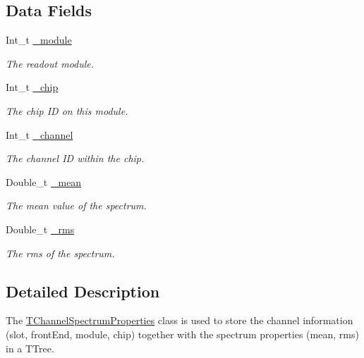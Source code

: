 \subsection*{Data Fields}
\begin{DoxyCompactItemize}
\item 
Int\_\-t \hyperlink{class_t_channel_spectrum_properties_ae3cf44950a58087f83b1660648750619}{\_\-module}
\begin{DoxyCompactList}\small\item\em The readout module. \item\end{DoxyCompactList}\item 
Int\_\-t \hyperlink{class_t_channel_spectrum_properties_afdfd4c52a9b23cd7cd76dda75b595e27}{\_\-chip}
\begin{DoxyCompactList}\small\item\em The chip ID on this module. \item\end{DoxyCompactList}\item 
Int\_\-t \hyperlink{class_t_channel_spectrum_properties_a6bfd5e0b63e55aed4d1816a722f5c2e7}{\_\-channel}
\begin{DoxyCompactList}\small\item\em The channel ID within the chip. \item\end{DoxyCompactList}\item 
Double\_\-t \hyperlink{class_t_channel_spectrum_properties_a480a137b650eda8d36fb633de95259d1}{\_\-mean}
\begin{DoxyCompactList}\small\item\em The mean value of the spectrum. \item\end{DoxyCompactList}\item 
Double\_\-t \hyperlink{class_t_channel_spectrum_properties_a1eb2a743128d8069e0e962dfaaff3367}{\_\-rms}
\begin{DoxyCompactList}\small\item\em The rms of the spectrum. \item\end{DoxyCompactList}\end{DoxyCompactItemize}


\subsection{Detailed Description}
The \hyperlink{class_t_channel_spectrum_properties}{TChannelSpectrumProperties} class is used to store the channel information (slot, frontEnd, module, chip) together with the spectrum properties (mean, rms) in a TTree. 

